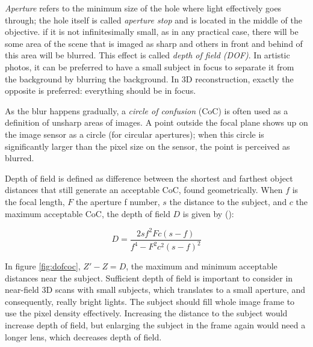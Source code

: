 
\emph{Aperture} refers to the minimum size of the hole where light effectively goes through; the hole itself is called \emph{aperture stop} and is located in the middle of the objective.
if it is not infinitesimally small, as in any practical case, there will be some area of the scene that is imaged as sharp and others in front and behind of this area will be blurred.
This effect is called \emph{depth of field (DOF)}.
In artistic photos, it can be preferred to have a small subject in focus to separate it from the background by blurring the background.
In 3D reconstruction, exactly the opposite is preferred: everything should be in focus.

As the blur happens gradually, a \emph{circle of confusion} (CoC) is often used as a definition of unsharp areas of images.
A point outside the focal plane shows up on the image sensor as a circle (for circular apertures); when this circle is significantly larger than the pixel size on the sensor, the point is perceived as blurred.

Depth of field is defined as difference between the shortest and farthest object distances that still generate an acceptable CoC, found geometrically.
When $f$ is the focal length, $F$ the aperture f number, $s$ the distance to the subject, and $c$ the maximum acceptable CoC, the depth of field $D$ is given by (\cite{greenleaf1950photographic}):

\begin{equation} \label{eq:dof}
	D = \frac{2 s f^2 F c (s - f)} {f^4 - F^2 c^2 (s - f)^2}
\end{equation}



In figure \ref{fig:dofcoc}, $Z' - Z = D$, the maximum and minimum acceptable distances near the subject.
Sufficient depth of field is important to consider in near-field 3D scans with small subjects, which translates to a small aperture, and consequently, really bright lights.
The subject should fill whole image frame to use the pixel density effectively.
Increasing the distance to the subject would increase depth of field, but enlarging the subject in the frame again would need a longer lens, which decreases depth of field.


